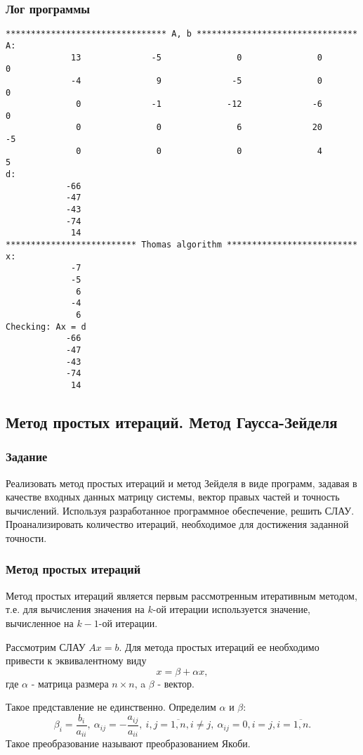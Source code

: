 \documentclass[a4paper,12pt]{article}
\begin{document}
\subsubsection{Лог программы}
\begin{verbatim}
******************************** A, b ********************************
A:
             13              -5               0               0               0
             -4               9              -5               0               0
              0              -1             -12              -6               0
              0               0               6              20              -5
              0               0               0               4               5
d:
            -66
            -47
            -43
            -74
             14
************************** Thomas algorithm **************************
x:
             -7
             -5
              6
             -4
              6
Checking: Ax = d
            -66
            -47
            -43
            -74
             14
\end{verbatim}
\newpage


\subsection{Метод простых итераций. Метод Гаусса-Зейделя}
\subsubsection{Задание}
Реализовать метод простых итераций и метод Зейделя в виде программ,
задавая в качестве входных данных матрицу системы, вектор правых
частей и точность вычислений. Используя разработанное программное
обеспечение, решить СЛАУ. Проанализировать количество итераций,
необходимое для достижения заданной точности.

\subsubsection{Метод простых итераций}
Метод простых итераций является первым рассмотренным
итеративным методом, т.е. для вычисления значения на $k$-ой
итерации используется значение, вычисленное на $k - 1$-ой
итерации.

Рассмотрим СЛАУ $Ax = b$. Для метода простых итераций ее
необходимо привести к эквивалентному виду
$$
x = \beta + \alpha x,
$$
где $\alpha$ - матрица размера $n \times n$, a $\beta$ - вектор.

Такое представление не единственно. Определим $\alpha$ и $\beta$:
$$
\beta_i = \frac{b_i}{a_{ii}},\ \alpha_{ij} = -\frac{a_{ij}}{a_{ii}},
\ i, j = \overline{1, n}, i \not = j,\ \alpha_{ij} = 0, i = j,
i = \overline{1, n}.
$$
Такое преобразование называют преобразованием Якоби.
\end{document}
